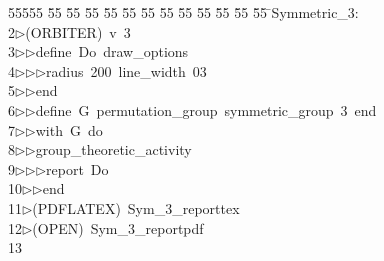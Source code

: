 %
%
\begin{tabbing}
55555 \= 55 \= 55 \= 55 \= 55 \= 55 \= 55 \= 55 \= 55 \= 55 \= 55 \= 55 \= 55 \= \>Symmetric\_3:\\[0pt]
2\>$\triangleright$\>(ORBITER)\ v\ 3\ \\[0pt]
3\>$\triangleright$\>$\triangleright$\>define\ Do\ draw\_options\ \\[0pt]
4\>$\triangleright$\>$\triangleright$\>$\triangleright$\>radius\ 200\ line\_width\ 03\ \\[0pt]
5\>$\triangleright$\>$\triangleright$\>end\ \\[0pt]
6\>$\triangleright$\>$\triangleright$\>define\ G\ permutation\_group\ symmetric\_group\ 3\ end\ \\[0pt]
7\>$\triangleright$\>$\triangleright$\>with\ G\ do\ \\[0pt]
8\>$\triangleright$\>$\triangleright$\>group\_theoretic\_activity\ \\[0pt]
9\>$\triangleright$\>$\triangleright$\>$\triangleright$\>report\ Do\ \\[0pt]
10\>$\triangleright$\>$\triangleright$\>end\\[0pt]
11\>$\triangleright$\>(PDFLATEX)\ Sym\_3\_reporttex\\[0pt]
12\>$\triangleright$\>(OPEN)\ Sym\_3\_reportpdf\\[0pt]
13\>\end{tabbing}
